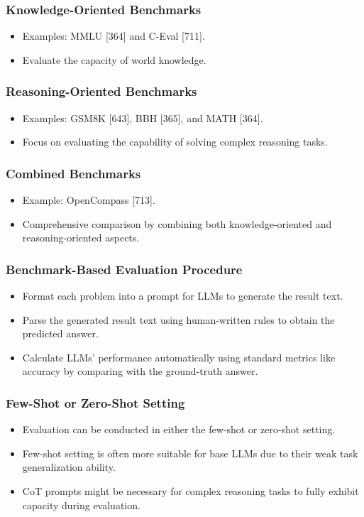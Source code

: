 \documentclass[handout]{beamer}
\begin{document}
\begin{frame}[t]
  \frametitle{Knowledge-Oriented Benchmarks}
  \begin{itemize}
    \item Examples: MMLU [364] and C-Eval [711].
    \item Evaluate the capacity of world knowledge.
  \end{itemize}
\end{frame}

\begin{frame}[t]
  \frametitle{Reasoning-Oriented Benchmarks}
  \begin{itemize}
    \item Examples: GSM8K [643], BBH [365], and MATH [364].
    \item Focus on evaluating the capability of solving complex reasoning tasks.
  \end{itemize}
\end{frame}

\begin{frame}[t]
  \frametitle{Combined Benchmarks}
  \begin{itemize}
    \item Example: OpenCompass [713].
    \item Comprehensive comparison by combining both knowledge-oriented and reasoning-oriented aspects.
  \end{itemize}
\end{frame}


\begin{frame}[t]
  \frametitle{Benchmark-Based Evaluation Procedure}
  \begin{itemize}
    \item Format each problem into a prompt for LLMs to generate the result text.
    \item Parse the generated result text using human-written rules to obtain the predicted answer.
    \item Calculate LLMs' performance automatically using standard metrics like accuracy by comparing with the ground-truth answer.
  \end{itemize}
\end{frame}

\begin{frame}[t]
  \frametitle{Few-Shot or Zero-Shot Setting}
  \begin{itemize}
    \item Evaluation can be conducted in either the few-shot or zero-shot setting.
    \item Few-shot setting is often more suitable for base LLMs due to their weak task generalization ability.
    \item CoT prompts might be necessary for complex reasoning tasks to fully exhibit capacity during evaluation.
  \end{itemize}
\end{frame}
\end{document}
